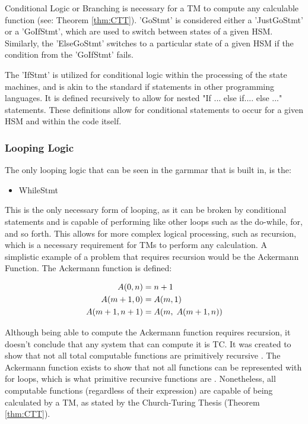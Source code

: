 Conditional Logic or Branching is necessary for a TM to compute any calculable function (see: Theorem \ref{thm:CTT}).
'GoStmt' is considered either a 'JustGoStmt' or a 'GoIfStmt', which are used to switch between states of a given HSM.
Similarly, the 'ElseGoStmt' switches to a particular state of a given HSM if the condition from the 'GoIfStmt' fails.

The 'IfStmt' is utilized for conditional logic within the processing of the state machines, and is akin to the standard if statements in other programming languages.
It is defined recursively to allow for nested "If ... else if.... else ..." statements.
These definitions allow for conditional statements to occur for a given HSM and within the code itself.

\subsubsection{Looping Logic}\label{subsubsec:LoopLog}

The only looping logic that can be seen in the garmmar that is built in, is the:
\begin{itemize}
    \item WhileStmt
\end{itemize}

This is the only necessary form of looping, as it can be broken by conditional statements and is capable of performing like other loops such as the do-while, for, and so forth.
This allows for more complex logical processing, such as recursion, which is a necessary requirement for TMs to perform any calculation.
A simplistic example of a problem that requires recursion would be the Ackermann Function.
The Ackermann function is defined:

\[
\begin{aligned}
    A(0, n) &= n + 1\\
    A(m + 1, 0) &= A(m,1)\\
    A(m + 1, n + 1) &= A(m,\hspace{0.1cm} A(m + 1,n))
\end{aligned}
\]

Although being able to compute the Ackermann function requires recursion, it doesn't conclude that any system that can compute it is TC.
It was created to show that not all total computable functions are primitively recursive \cite{AckermannPR}.
The Ackermann function exists to show that not all functions can be represented with for loops, which is what primitive recursive functions are \cite{RecursiveFuncs}.
Nonetheless, all computable functions (regardless of their expression) are capable of being calculated by a TM, as stated by the Church-Turing Thesis (Theorem \ref{thm:CTT}).

